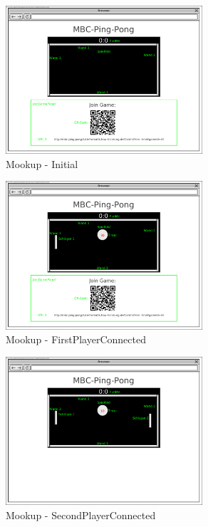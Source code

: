 		\begin{figure}[!htb]
			\centering
			\includegraphics[width=0.65\textwidth]{architecture/Mookup - Initial.png}
			\caption{Mookup - Initial}
			\label{Mookup - Initial}
		\end{figure}
		
		\begin{figure}[!htb]
			\centering
			\includegraphics[width=0.65\textwidth]{architecture/Mookup - FirstPlayerConnected.png}
			\caption{Mookup - FirstPlayerConnected}
			\label{Mookup - FirstPlayerConnected}
		\end{figure}
		
		\begin{figure}[!htb]
			\centering
			\includegraphics[width=0.65\textwidth]{architecture/Mookup - SecondPlayerConnected.png}
			\caption{Mookup - SecondPlayerConnected}
			\label{Mookup - SecondPlayerConnected}
		\end{figure}
		

